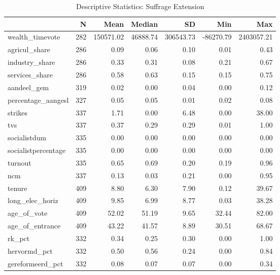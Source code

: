 \begin{table}[!h]

\caption{\label{tab:descriptives_suffrage}Descriptive Statistics: Suffrage Extension}
\centering
\fontsize{9}{11}\selectfont
\begin{tabular}[t]{lrrrrrr}
\toprule
  & N & Mean & Median & SD & Min & Max\\
\midrule
wealth\_timevote & 282 & 150571.02 & 46888.74 & 306543.73 & -86270.79 & 2403057.21\\
agricul\_share & 286 & 0.09 & 0.06 & 0.10 & 0.01 & 0.43\\
industry\_share & 286 & 0.33 & 0.31 & 0.08 & 0.21 & 0.67\\
services\_share & 286 & 0.58 & 0.63 & 0.15 & 0.15 & 0.75\\
aandeel\_gem & 319 & 0.02 & 0.00 & 0.04 & 0.00 & 0.12\\
percentage\_aangesl & 327 & 0.05 & 0.05 & 0.01 & 0.02 & 0.08\\
strikes & 337 & 1.71 & 0.00 & 6.48 & 0.00 & 38.00\\
tvs & 337 & 0.37 & 0.29 & 0.29 & 0.01 & 1.00\\
socialistdum & 335 & 0.00 & 0.00 & 0.00 & 0.00 & 0.00\\
socialistpercentage & 335 & 0.00 & 0.00 & 0.00 & 0.00 & 0.00\\
turnout & 335 & 0.65 & 0.69 & 0.20 & 0.19 & 0.96\\
ncm & 337 & 0.13 & 0.03 & 0.21 & 0.00 & 0.95\\
tenure & 409 & 8.80 & 6.30 & 7.90 & 0.12 & 39.67\\
long\_elec\_horiz & 409 & 9.85 & 6.99 & 8.77 & 0.03 & 38.28\\
age\_of\_vote & 409 & 52.02 & 51.19 & 9.65 & 32.44 & 82.00\\
age\_of\_entrance & 409 & 43.22 & 41.57 & 8.89 & 30.51 & 68.67\\
rk\_pct & 332 & 0.34 & 0.25 & 0.30 & 0.00 & 1.00\\
hervormd\_pct & 332 & 0.50 & 0.56 & 0.24 & 0.00 & 0.84\\
gereformeerd\_pct & 332 & 0.08 & 0.07 & 0.07 & 0.00 & 0.34\\
\bottomrule
\end{tabular}
\end{table}